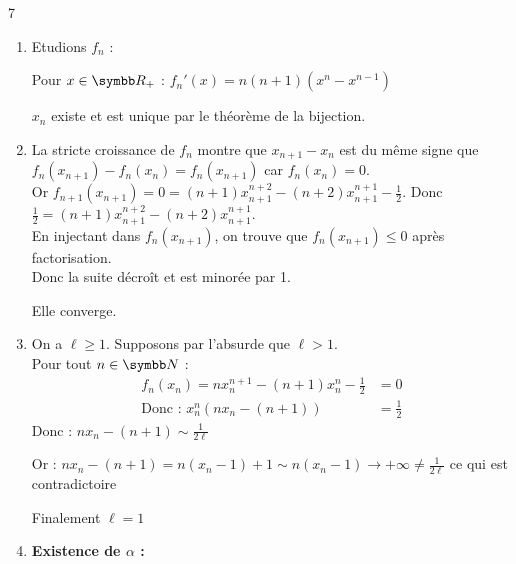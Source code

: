 \begin{correction}{7}
\begin{enumerate}

    \item Etudions $f_n$ :

    Pour $x\in\R_+$ : $f_n'(x) = n(n+1)\left(x^n -x^{n-1}\right)$


    $x_n$ existe et est unique par le théorème de la bijection.
    
    \item La stricte croissance de $f_{n}$ montre que $x_{n+1}-x_{n}$ 
        est du même signe que $f_{n}(x_{n+1})-f_{n}(x_{n})=f_{n}(x_{n+1})$ car $f_n(x_n)=0$. \\
        Or $f_{n+1}(x_{n+1})=0=(n+1)x_{n+1}^{n+2}-(n+2)x_{n+1}^{n+1}-\frac{1}{2}$.
        Donc $\frac{1}{2}=(n+1)x_{n+1}^{n+2}-(n+2)x_{n+1}^{n+1}$. \\
        En injectant dans $f_n(x_{n+1})$, on trouve que $f_{n}(x_{n+1}) \leqslant 0$ après factorisation. \\
        Donc la suite décroît et est minorée par 1.

        Elle converge.

    \item On a $\ell\ge1$. Supposons par l'absurde que $\ell>1$.  \\

    Pour tout $n\in\N$ :
    \begin{align*}
        f_{n}(x_n)=nx_n^{n+1}-(n+1)x_n^{n}-\frac{1}{2} &= 0 \\
        \text{Donc : } x_n^n (nx_n - (n+1)) &= \frac{1}{2} 
    \end{align*}
    Donc : $ nx_n - (n+1) \sim \frac{1}{2\ell}$

    Or : $ nx_n - (n+1) = n(x_n-1) + 1 \sim n(x_n-1) \to+\infty \neq \frac{1}{2\ell}$ ce qui est contradictoire

    Finalement $\ell=1$ 

    \item \textbf{Existence de $\alpha$ :} 


\end{enumerate}
\end{correction}
